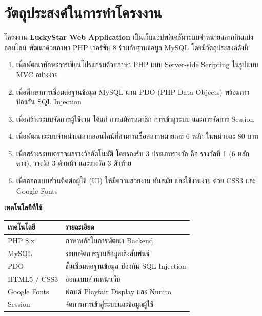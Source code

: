 \documentclass[a4paper,12pt]{article}
\begin{document}
\section*{วัตถุประสงค์ในการทำโครงงาน}

โครงงาน \textbf{LuckyStar Web Application} เป็นเว็บแอปพลิเคชันระบบจำหน่ายสลากกินแบ่งออนไลน์
พัฒนาด้วยภาษา PHP เวอร์ชัน 8 ร่วมกับฐานข้อมูล MySQL โดยมีวัตถุประสงค์ดังนี้

\begin{enumerate}[leftmargin=2cm, label=\arabic*., topsep=2pt, itemsep=1pt]
\item เพื่อพัฒนาทักษะการเขียนโปรแกรมด้วยภาษา PHP แบบ Server-side Scripting ในรูปแบบ MVC อย่างง่าย
\item เพื่อศึกษาการเชื่อมต่อฐานข้อมูล MySQL ผ่าน PDO (PHP Data Objects) พร้อมการป้องกัน SQL Injection
\item เพื่อสร้างระบบจัดการผู้ใช้งาน ได้แก่ การสมัครสมาชิก การเข้าสู่ระบบ และการจัดการ Session
\item เพื่อพัฒนาระบบจำหน่ายสลากออนไลน์ที่สามารถซื้อสลากหมายเลข 6 หลัก ในหน่วยละ 80 บาท
\item เพื่อสร้างระบบตรวจผลรางวัลอัตโนมัติ โดยรองรับ 3 ประเภทรางวัล คือ รางวัลที่ 1 (6 หลักตรง), รางวัล 3 ตัวหน้า และรางวัล 3 ตัวท้าย
\item เพื่อออกแบบส่วนติดต่อผู้ใช้ (UI) ให้มีความสวยงาม ทันสมัย และใช้งานง่าย ด้วย CSS3 และ Google Fonts
\end{enumerate}

\vspace{0.8em}
\noindent\textbf{เทคโนโลยีที่ใช้}

\vspace{0.4em}
\begin{tabularx}{\textwidth}{|l|X|}
\hline
\textbf{เทคโนโลยี} & \textbf{รายละเอียด} \\
\hline
PHP 8.x      & ภาษาหลักในการพัฒนา Backend \\
\hline
MySQL        & ระบบจัดการฐานข้อมูลเชิงสัมพันธ์ \\
\hline
PDO          & ชั้นเชื่อมต่อฐานข้อมูล ป้องกัน SQL Injection \\
\hline
HTML5 / CSS3 & ออกแบบส่วนหน้าเว็บ \\
\hline
Google Fonts & ฟอนต์ Playfair Display และ Nunito \\
\hline
Session      & จัดการการเข้าสู่ระบบและข้อมูลผู้ใช้ \\
\hline
\end{tabularx}
\end{document}

